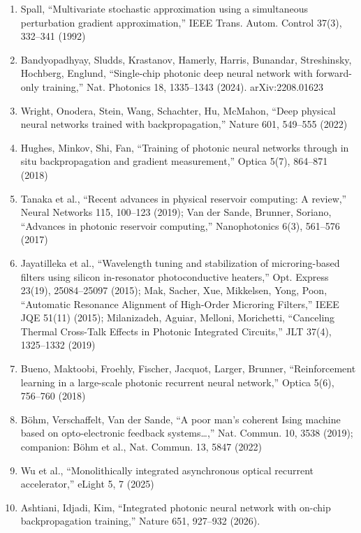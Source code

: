 \documentclass[
  10pt,
]{article}
\providecommand{\tightlist}{%
  \setlength{\itemsep}{0pt}\setlength{\parskip}{0pt}}
\begin{document}
\begin{enumerate}
\def\labelenumi{\arabic{enumi}.}
\tightlist
\item
  Spall, ``Multivariate stochastic approximation using a simultaneous
  perturbation gradient approximation,'' IEEE Trans. Autom. Control
  37(3), 332--341 (1992)
\item
  Bandyopadhyay, Sludds, Krastanov, Hamerly, Harris, Bunandar,
  Streshinsky, Hochberg, Englund, ``Single-chip photonic deep neural
  network with forward-only training,'' Nat. Photonics 18, 1335--1343
  (2024). arXiv:2208.01623
\item
  Wright, Onodera, Stein, Wang, Schachter, Hu, McMahon, ``Deep physical
  neural networks trained with backpropagation,'' Nature 601, 549--555
  (2022)
\item
  Hughes, Minkov, Shi, Fan, ``Training of photonic neural networks
  through in situ backpropagation and gradient measurement,'' Optica
  5(7), 864--871 (2018)
\item
  Tanaka et al., ``Recent advances in physical reservoir computing: A
  review,'' Neural Networks 115, 100--123 (2019); Van der Sande,
  Brunner, Soriano, ``Advances in photonic reservoir computing,''
  Nanophotonics 6(3), 561--576 (2017)
\item
  Jayatilleka et al., ``Wavelength tuning and stabilization of
  microring-based filters using silicon in-resonator photoconductive
  heaters,'' Opt. Express 23(19), 25084--25097 (2015); Mak, Sacher, Xue,
  Mikkelsen, Yong, Poon, ``Automatic Resonance Alignment of High-Order
  Microring Filters,'' IEEE JQE 51(11) (2015); Milanizadeh, Aguiar,
  Melloni, Morichetti, ``Canceling Thermal Cross-Talk Effects in
  Photonic Integrated Circuits,'' JLT 37(4), 1325--1332 (2019)
\item
  Bueno, Maktoobi, Froehly, Fischer, Jacquot, Larger, Brunner,
  ``Reinforcement learning in a large-scale photonic recurrent neural
  network,'' Optica 5(6), 756--760 (2018)
\item
  Böhm, Verschaffelt, Van der Sande, ``A poor man's coherent Ising
  machine based on opto-electronic feedback systems\ldots,'' Nat.
  Commun. 10, 3538 (2019); companion: Böhm et al., Nat. Commun. 13, 5847
  (2022)
\item
  Wu et al., ``Monolithically integrated asynchronous optical recurrent
  accelerator,'' eLight 5, 7 (2025)
\item
  Ashtiani, Idjadi, Kim, ``Integrated photonic neural network with
  on-chip backpropagation training,'' Nature 651, 927--932 (2026).

\end{enumerate}
\end{document}

